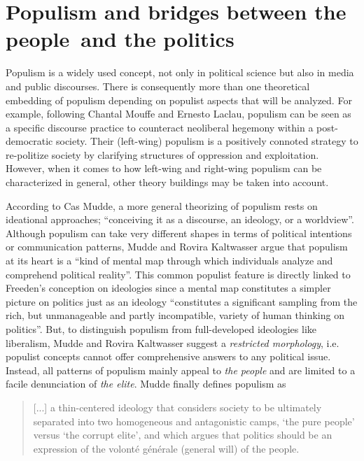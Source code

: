 \documentclass[a4paper]{scrreprt}
\begin{document}
\section{Populism and bridges between \guilsinglright the people\guilsinglleft\ and \guilsinglright the politics\guilsinglleft}
Populism is a widely used concept, not only in political science but also in media and public discourses. There is consequently more than one theoretical embedding of populism depending on populist aspects that will be analyzed. For example, following Chantal Mouffe and Ernesto Laclau, populism can be seen as a specific discourse practice to counteract neoliberal hegemony within a post-democratic society. Their (left-wing) populism is a positively connoted strategy to re-politize society by clarifying structures of oppression and exploitation. \citep{laclaumouffe:2001} However, when it comes to how left-wing and right-wing populism can be characterized in general, other theory buildings may be taken into account.\par
According to Cas Mudde, a more general theorizing of populism rests on ideational approaches; ``conceiving it as a discourse, an ideology, or a worldview''. \cite[p.~5]{mudde:2017} Although populism can take very different shapes in terms of political intentions or communication patterns, Mudde and Rovira Kaltwasser argue that populism at its heart is a ``kind of mental map through which individuals analyze and comprehend political reality''. \cite[p.~6]{mudde:2017} This common populist feature is directly linked to Freeden's conception on ideologies since a mental map constitutes a simpler picture on politics just as an ideology ``constitutes a significant sampling from the rich, but unmanageable and partly incompatible, variety of human thinking on politics''. \cite[p.~54]{freeden:1998} But, to distinguish populism from full-developed ideologies like liberalism, Mudde and Rovira Kaltwasser suggest a {\em restricted morphology}, i.e. populist concepts cannot offer comprehensive answers to any political issue. Instead, all patterns of populism mainly appeal to {\em the people} and are limited to a facile denunciation of {\em the elite}. Mudde finally defines populism as\par
\begin{quote}
    [...] a thin-centered ideology that considers society to be ultimately separated into two homogeneous and antagonistic camps, `the pure people' versus `the corrupt elite', and which argues that politics should be an expression of the volonté générale (general will) of the people. \cite[p.~6]{mudde:2017}
\end{quote}
\end{document}
